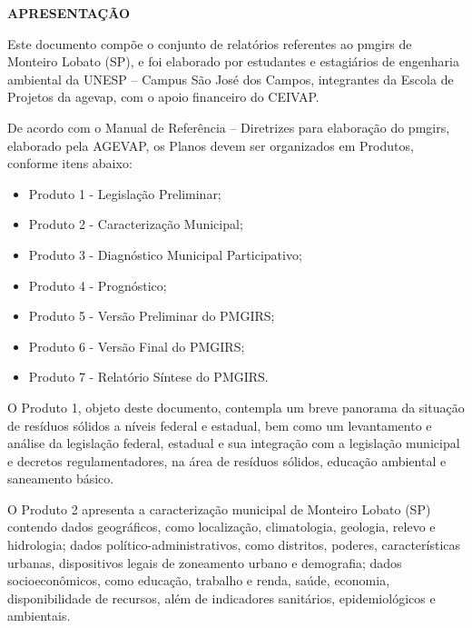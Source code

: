 \thispagestyle{headfootimage}

\begin{center}
    {\bfseries\Large\MakeUppercase{Apresentação}}
    \vspace{1.5em}
\end{center}
Este documento compõe o conjunto de relatórios referentes ao \gls{pmgirs} de Monteiro Lobato (SP), e foi elaborado por estudantes e estagiários de engenharia ambiental da UNESP – Campus São José dos Campos, integrantes da Escola de Projetos da \gls{agevap}, com o apoio financeiro do CEIVAP.\vspace{1.5em}

De acordo com o Manual de Referência – Diretrizes para elaboração do \gls{pmgirs}, elaborado pela AGEVAP, os Planos devem ser organizados em Produtos, conforme itens abaixo:

\begin{itemize}
    \item {Produto 1 - Legislação Preliminar;}
    \item {Produto 2 - Caracterização Municipal;}
    \item {Produto 3 - Diagnóstico Municipal Participativo;}
    \item Produto 4 - Prognóstico;
    \item Produto 5 - Versão Preliminar do PMGIRS;
    \item Produto 6 - Versão Final do PMGIRS;
    \item Produto 7 - Relatório Síntese do PMGIRS.
\end{itemize}



O Produto 1, objeto deste documento, contempla um breve panorama da situação de resíduos sólidos a níveis federal e estadual, bem como um levantamento e análise da legislação federal, estadual e sua integração com a legislação municipal e decretos regulamentadores, na área de resíduos sólidos, educação ambiental e saneamento básico.\vspace{1.5em}

O Produto 2 apresenta a caracterização municipal de Monteiro Lobato (SP) contendo dados geográficos, como localização, climatologia, geologia, relevo e hidrologia; dados político-administrativos, como distritos, poderes, características urbanas, dispositivos legais de zoneamento urbano e demografia; dados socioeconômicos, como educação, trabalho e renda, saúde, economia, disponibilidade de recursos, além de indicadores sanitários, epidemiológicos e ambientais.\vspace{1.5em}

